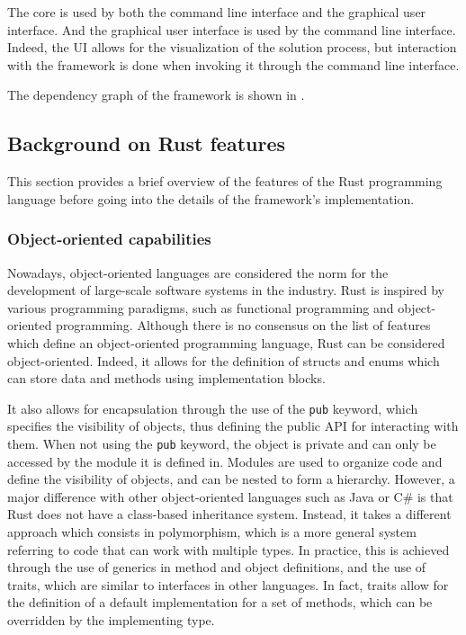 The core is used by both the command line interface and the graphical user interface. And the graphical user interface is used by the command line interface.
Indeed, the UI allows for the visualization of the solution process, but interaction with the framework is done when invoking it through the command line interface.

The dependency graph of the framework is shown in .


\subsection{Background on Rust features}

This section provides a brief overview of the features of the Rust programming language before going into the details of the framework's implementation.

\subsubsection{Object-oriented capabilities}

Nowadays, object-oriented languages are considered the norm for the development of large-scale software systems in the industry.
Rust is inspired by various programming paradigms, such as functional programming and object-oriented programming.
Although there is no consensus on the list of features which define an object-oriented programming language, Rust can be considered object-oriented.
Indeed, it allows for the definition of structs and enums which can store data and methods using implementation blocks.

It also allows for encapsulation through the use of the \texttt{pub} keyword, which specifies the visibility of objects, thus defining the public API for interacting
with them. When not using the \texttt{pub} keyword, the object is private and can only be accessed by the module it is defined in.
Modules are used to organize code and define the visibility of objects, and can be nested to form a hierarchy.
However, a major difference with other object-oriented languages such as Java or C\# is that Rust does not have a class-based inheritance system.
Instead, it takes a different approach which consists in polymorphism, which is a more general system referring to code that can work with multiple types.
In practice, this is achieved through the use of generics in method and object definitions, and the use of traits, which are similar to interfaces in other languages.
In fact, traits allow for the definition of a default implementation for a set of methods, which can be overridden by the implementing type.

